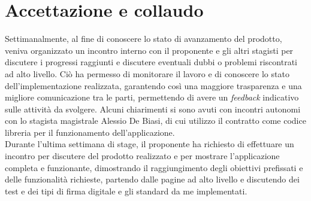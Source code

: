\clearpage

\section{Accettazione e collaudo}\label{sec:verifica-validazione-accettazione}

Settimanalmente, al fine di conoscere lo stato di avanzamento del prodotto, veniva organizzato un incontro interno con
il proponente e gli altri stagisti per discutere i progressi raggiunti e discutere eventuali dubbi o problemi riscontrati ad alto livello.
Ciò ha permesso di monitorare il lavoro e di conoscere lo stato dell'implementazione realizzata, garantendo così una maggiore
trasparenza e una migliore comunicazione tra le parti, permettendo di avere un \textit{feedback} indicativo sulle attività da svolgere.
Alcuni chiarimenti si sono avuti con incontri autonomi con lo stagista magistrale Alessio De Biasi, di cui utilizzo il contratto come codice libreria 
per il funzionamento dell'applicazione. \\

Durante l'ultima settimana di stage, il proponente ha richiesto di effettuare un incontro per discutere del prodotto realizzato e per
mostrare l'applicazione completa e funzionante, dimostrando il raggiungimento degli obiettivi prefissati e delle funzionalità richieste, 
partendo dalle pagine ad alto livello e discutendo dei test e dei tipi di firma digitale e gli standard da me implementati. 